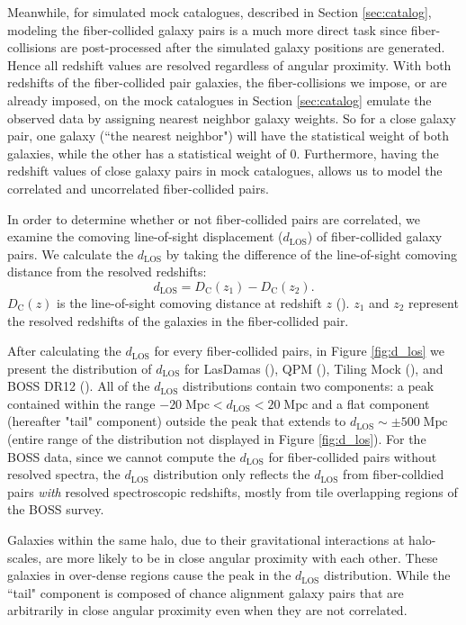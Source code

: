 \documentclass{emulateapj}
\begin{document}
Meanwhile, for simulated mock catalogues, described in Section \ref{sec:catalog}, modeling the fiber-collided galaxy pairs is a much more direct task since fiber-collisions are post-processed after the simulated galaxy positions are generated. Hence all redshift values are resolved regardless of angular proximity. With both redshifts of the fiber-collided pair galaxies, the fiber-collisions we impose, or are already imposed, on the mock catalogues in Section \ref{sec:catalog} emulate the observed data by assigning nearest neighbor galaxy weights. So for a close galaxy pair, one galaxy (``the nearest neighbor") will have the statistical weight of both galaxies, while the other has a statistical weight of $0$. Furthermore, having the redshift values of close galaxy pairs in mock catalogues, allows us to model the correlated and uncorrelated fiber-collided pairs. 

In order to determine whether or not fiber-collided pairs are correlated, we examine the comoving line-of-sight displacement ($d_{\mathrm{LOS}}$) of fiber-collided galaxy pairs. We calculate the $d_{\mathrm{LOS}}$ by taking the difference of the line-of-sight comoving distance from the resolved redshifts: 
\begin{equation}
d_{\mathrm{LOS}} = D_{\mathrm{C}} (z_1) - D_{\mathrm{C}} (z_2). 
\end{equation}
$D_{\mathrm{C}}(z)$ is the line-of-sight comoving distance at redshift $z$ (\citealt{Hogg:1999aa}). $z_1$ and $z_2$ represent the resolved redshifts of the galaxies in the fiber-collided pair.

After calculating the $d_{\mathrm{LOS}}$ for every fiber-collided pairs, in Figure \ref{fig:d_los} we present the distribution of $d_{\mathrm{LOS}}$ for LasDamas (\ldgcolor), QPM (\qpmcolor), Tiling Mock (\tmcolor), and BOSS DR12 (\cmasscolor). All of the $d_{\mathrm{LOS}}$ distributions contain two components: a peak contained within the range $-20\;\mathrm{Mpc} < d_{\mathrm{LOS}} < 20\;\mathrm{Mpc}$ and a flat component (hereafter "tail" component) outside the peak that extends to $d_{\mathrm{LOS}} \sim \pm 500 \;\mathrm{Mpc}$ (entire range of the distribution not displayed in Figure \ref{fig:d_los}). For the BOSS data, since we cannot compute the $d_\mathrm{LOS}$ for fiber-collided pairs without resolved spectra, the $d_\mathrm{LOS}$ distribution only reflects the $d_\mathrm{LOS}$ from fiber-colldied pairs {\em with} resolved spectroscopic redshifts, mostly from tile overlapping regions of the BOSS survey.

Galaxies within the same halo, due to their gravitational interactions at halo-scales, are more likely to be in close angular proximity with each other. These galaxies in over-dense regions cause the peak in the $d_{\mathrm{LOS}}$ distribution. While the ``tail" component is composed of chance alignment galaxy pairs that are arbitrarily in close angular proximity even when they are not correlated. 
\end{document}
